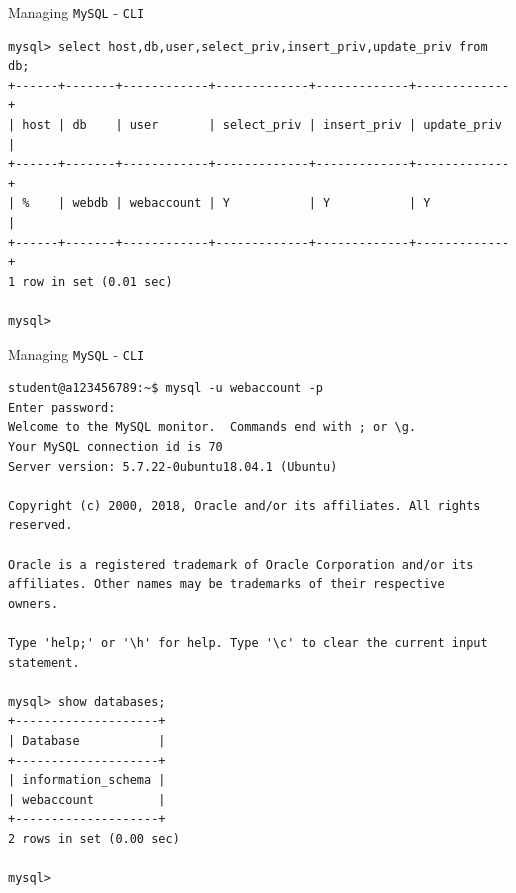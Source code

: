 \documentclass[xcolor=table,aspectratio=169]{beamer}
\begin{document}
\begin{frame}[fragile]{Managing \texttt{MySQL} - \texttt{CLI}}
  \begin{tcolorbox}
    \lstset{
      basicstyle=\Tiny\ttfamily,
    }
    \begin{lstlisting}
mysql> select host,db,user,select_priv,insert_priv,update_priv from db;
+------+-------+------------+-------------+-------------+-------------+
| host | db    | user       | select_priv | insert_priv | update_priv |
+------+-------+------------+-------------+-------------+-------------+
| %    | webdb | webaccount | Y           | Y           | Y           |
+------+-------+------------+-------------+-------------+-------------+
1 row in set (0.01 sec)
      
mysql>     
    \end{lstlisting}
  \end{tcolorbox}
\end{frame}

\begin{frame}[fragile]{Managing \texttt{MySQL} - \texttt{CLI}}
  \begin{tcolorbox}
    \lstset{
      basicstyle=\Tiny\ttfamily,
    }
    \begin{lstlisting}
student@a123456789:~$ mysql -u webaccount -p
Enter password:
Welcome to the MySQL monitor.  Commands end with ; or \g.
Your MySQL connection id is 70
Server version: 5.7.22-0ubuntu18.04.1 (Ubuntu)
      
Copyright (c) 2000, 2018, Oracle and/or its affiliates. All rights reserved.
     
Oracle is a registered trademark of Oracle Corporation and/or its
affiliates. Other names may be trademarks of their respective
owners.
      
Type 'help;' or '\h' for help. Type '\c' to clear the current input statement.
      
mysql> show databases;
+--------------------+
| Database           |
+--------------------+
| information_schema |
| webaccount         |
+--------------------+
2 rows in set (0.00 sec)
      
mysql>
    \end{lstlisting}
  \end{tcolorbox}
\end{frame}
\end{document}
